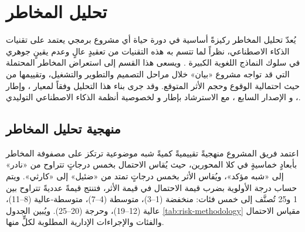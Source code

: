 \section{تحليل المخاطر}
\label{sec:risk-analysis}

يُعدّ تحليل المخاطر ركيزةً أساسية في دورة حياة أي مشروع برمجي يعتمد على تقنيات الذكاء الاصطناعي، نظراً لما تتسم به هذه التقنيات من تعقيدٍ عالٍ وعدم يقينٍ جوهري في سلوك النماذج اللغوية الكبيرة . ويسعى هذا القسم إلى استعراض المخاطر المحتملة التي قد تواجه مشروع «بيان» خلال مراحل التصميم والتطوير والتشغيل، وتقييمها من حيث احتمالية الوقوع وحجم الأثر المتوقع. وقد جرى بناء هذا التحليل وفقاً لمعيار  \cite{iso31000}، وإطار  \cite{nist800-30}، و  الإصدار السابع \cite{pmbok7}، مع الاسترشاد بإطار  \cite{nist-airmf} و  \cite{owasp-llm} لخصوصية أنظمة الذكاء الاصطناعي التوليدي.

\subsection{منهجية تحليل المخاطر}
\label{subsec:risk-methodology}

اعتمد فريق المشروع منهجيةً تقييميةً كميةً شبه موضوعية ترتكز على مصفوفة المخاطر بأبعادٍ خماسيةٍ في كلا المحورين، حيث يُقاس الاحتمال بخمس درجاتٍ تتراوح من «نادر» إلى «شبه مؤكد»، ويُقاس الأثر بخمس درجاتٍ تمتد من «ضئيل» إلى «كارثي». ويتم حساب درجة الأولوية بضرب قيمة الاحتمال في قيمة الأثر، فتنتج قيمةً عدديةً تتراوح بين 1 و25 تُصنَّف إلى خمس فئات: منخفضة (1--3)، متوسطة (4--7)، متوسطة-عالية (8--11)، عالية (12--19)، وحرجة (20--25). ويُبين الجدول \ref{tab:risk-methodology} مقياس الاحتمال والفئات والإجراءات الإدارية المطلوبة لكلٍّ منها.

